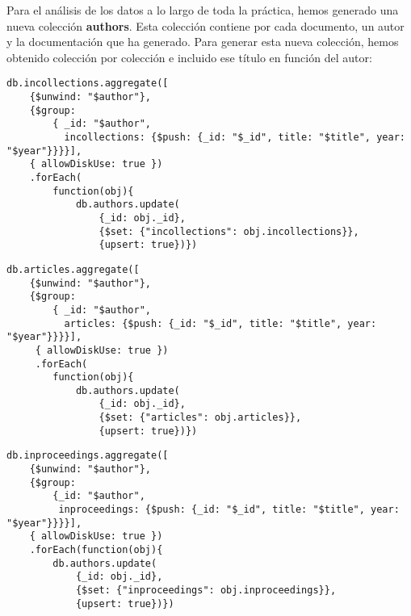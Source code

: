 Para el análisis de los datos a lo largo de toda la práctica, hemos generado una nueva colección \textbf{authors}. Esta colección contiene por cada documento, un autor y la documentación que ha generado. Para generar esta nueva colección, hemos obtenido colección por colección e incluido ese título en función del autor:

\begin{verbatim}
db.incollections.aggregate([
    {$unwind: "$author"},
    {$group:
        { _id: "$author",
          incollections: {$push: {_id: "$_id", title: "$title", year: "$year"}}}}],
    { allowDiskUse: true })
    .forEach(
        function(obj){
            db.authors.update(
                {_id: obj._id},
                {$set: {"incollections": obj.incollections}},
                {upsert: true})})
\end{verbatim}

\begin{verbatim}
db.articles.aggregate([
    {$unwind: "$author"},
    {$group:
        { _id: "$author",
          articles: {$push: {_id: "$_id", title: "$title", year: "$year"}}}}],
     { allowDiskUse: true })
     .forEach(
        function(obj){
            db.authors.update(
                {_id: obj._id},
                {$set: {"articles": obj.articles}},
                {upsert: true})})
\end{verbatim}

\begin{verbatim}
db.inproceedings.aggregate([
    {$unwind: "$author"},
    {$group: 
        {_id: "$author",
         inproceedings: {$push: {_id: "$_id", title: "$title", year: "$year"}}}}],
    { allowDiskUse: true })
    .forEach(function(obj){
        db.authors.update(
            {_id: obj._id},
            {$set: {"inproceedings": obj.inproceedings}},
            {upsert: true})})
\end{verbatim}



